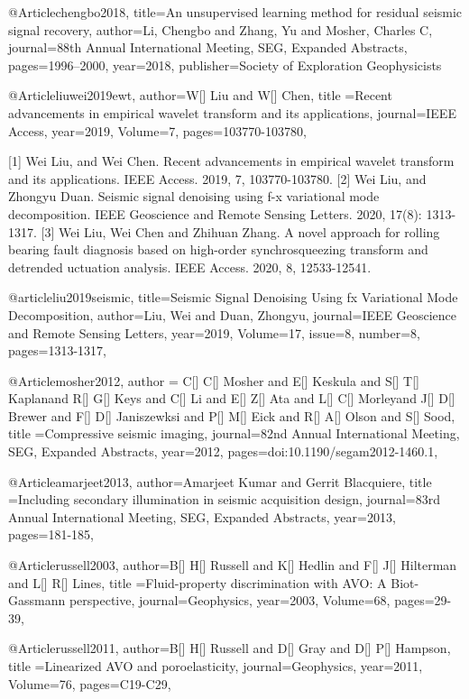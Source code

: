 @Article{chengbo2018,
  title={An unsupervised learning method for residual seismic signal recovery},
  author={Li, Chengbo and Zhang, Yu and Mosher, Charles C},
  journal={88th Annual International Meeting, SEG, Expanded Abstracts},
  pages={1996--2000},
  year={2018},
  publisher={Society of Exploration Geophysicists}
}

@Article{liuwei2019ewt,
  author={W[] Liu and W[] Chen},
  title ={Recent advancements in empirical wavelet transform and its applications},
  journal={IEEE Access},
  year=2019,
  Volume=7,
  pages={103770-103780},
}

[1] Wei Liu, and Wei Chen. Recent advancements in empirical wavelet transform and its applications. IEEE Access. 2019, 7, 103770-103780.
[2] Wei Liu, and Zhongyu Duan. Seismic signal denoising using f-x variational mode decomposition. IEEE Geoscience and Remote Sensing Letters. 2020, 17(8): 1313-1317.
[3] Wei Liu, Wei Chen and Zhihuan Zhang. A novel approach for rolling bearing fault diagnosis based on high-order synchrosqueezing transform and detrended uctuation analysis. IEEE Access. 2020, 8, 12533-12541.

@article{liu2019seismic,
  title={Seismic Signal Denoising Using fx Variational Mode Decomposition},
  author={Liu, Wei and Duan, Zhongyu},
  journal={IEEE Geoscience and Remote Sensing Letters},
  year={2019},
  Volume=17,
  issue=8,
  number=8,
  pages={1313-1317},
}


@Article{mosher2012,
  author = {C[] C[] Mosher and E[] Keskula and S[] T[] Kaplanand R[] G[] Keys and C[] Li and E[] Z[] Ata and L[] C[] Morleyand J[] D[] Brewer and F[] D[] Janiszewksi and P[] M[] Eick and R[] A[] Olson and S[] Sood},
  title ={Compressive seismic imaging},
  journal={82nd Annual International Meeting, SEG, Expanded Abstracts},
  year=2012,
  pages={doi:10.1190/segam2012-1460.1},
}


@Article{amarjeet2013,
  author={Amarjeet Kumar and Gerrit Blacquiere},
  title ={Including secondary illumination in seismic acquisition design},
  journal={83rd Annual International Meeting, SEG, Expanded Abstracts},
  year=2013,
  pages={181-185},
}

@Article{russell2003,
  author={B[] H[] Russell and K[] Hedlin and F[] J[] Hilterman and L[] R[] Lines},
  title ={Fluid-property discrimination with AVO: A Biot-Gassmann perspective},
  journal={Geophysics},
  year=2003,
  Volume=68,
  pages={29-39},
}

@Article{russell2011,
  author={B[] H[] Russell and D[] Gray and D[] P[] Hampson},
  title ={Linearized AVO and poroelasticity},
  journal={Geophysics},
  year=2011,
  Volume=76,
  pages={C19-C29},
}

